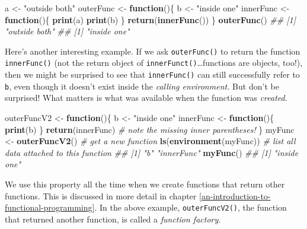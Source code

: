 \documentclass[12pt,krantz2]{krantz}
\makeatletter
\newenvironment{Shaded}{\begin{snugshade}}{\end{snugshade}}
\newcommand{\CommentTok}[1]{\textcolor[rgb]{0.37,0.37,0.37}{\textit{#1}}}
\newcommand{\ControlFlowTok}[1]{\textcolor[rgb]{0.27,0.27,0.27}{\textbf{#1}}}
\newcommand{\KeywordTok}[1]{\textcolor[rgb]{0.27,0.27,0.27}{\textbf{#1}}}
\newcommand{\NormalTok}[1]{#1}
\newcommand{\StringTok}[1]{\textcolor[rgb]{0.5,0.5,0.5}{#1}}
\newenvironment{kframe}{%
\medskip{}
\setlength{\fboxsep}{.8em}
 \def\at@end@of@kframe{}%
 \ifinner\ifhmode%
  \def\at@end@of@kframe{\end{minipage}}%
  \begin{minipage}{\columnwidth}%
 \fi\fi%
 \def\FrameCommand##1{\hskip\@totalleftmargin \hskip-\fboxsep
 \colorbox{shadecolor}{##1}\hskip-\fboxsep
     \hskip-\linewidth \hskip-\@totalleftmargin \hskip\columnwidth}%
 \MakeFramed {\advance\hsize-\width
   \@totalleftmargin\z@ \linewidth\hsize
   \@setminipage}}%
 {\par\unskip\endMakeFramed%
 \at@end@of@kframe}
\renewenvironment{Shaded}{\begin{kframe}}{\end{kframe}}
\makeatother
\begin{document}
\begin{Shaded}
\begin{Highlighting}[]
\NormalTok{a <-}\StringTok{ "outside both"}
\NormalTok{outerFunc <-}\StringTok{ }\ControlFlowTok{function}\NormalTok{()\{}
\NormalTok{  b <-}\StringTok{ "inside one"}
\NormalTok{  innerFunc <-}\StringTok{ }\ControlFlowTok{function}\NormalTok{()\{}
    \KeywordTok{print}\NormalTok{(a) }
    \KeywordTok{print}\NormalTok{(b)}
\NormalTok{  \}}
  \KeywordTok{return}\NormalTok{(}\KeywordTok{innerFunc}\NormalTok{())}
\NormalTok{\}}
\KeywordTok{outerFunc}\NormalTok{()}
\CommentTok{## [1] "outside both"}
\CommentTok{## [1] "inside one"}
\end{Highlighting}
\end{Shaded}

Here's another interesting example. If we ask \texttt{outerFunc()} to return the function \texttt{innerFunc()} (not the return object of \texttt{innerFunct()}\ldots{}functions are objects, too!), then we might be surprised to see that \texttt{innerFunc()} can still successfully refer to \texttt{b}, even though it doesn't exist inside the \emph{calling environment.} But don't be surprised! What matters is what was available when the function was \emph{created}.

\begin{Shaded}
\begin{Highlighting}[]
\NormalTok{outerFuncV2 <-}\StringTok{ }\ControlFlowTok{function}\NormalTok{()\{}
\NormalTok{  b <-}\StringTok{ "inside one"}
\NormalTok{  innerFunc <-}\StringTok{ }\ControlFlowTok{function}\NormalTok{()\{}
    \KeywordTok{print}\NormalTok{(b)}
\NormalTok{  \}}
  \KeywordTok{return}\NormalTok{(innerFunc) }\CommentTok{# note the missing inner parentheses!}
\NormalTok{\}}
\NormalTok{myFunc <-}\StringTok{ }\KeywordTok{outerFuncV2}\NormalTok{() }\CommentTok{# get a new function}
\KeywordTok{ls}\NormalTok{(}\KeywordTok{environment}\NormalTok{(myFunc)) }\CommentTok{# list all data attached to this function}
\CommentTok{## [1] "b"         "innerFunc"}
\KeywordTok{myFunc}\NormalTok{()}
\CommentTok{## [1] "inside one"}
\end{Highlighting}
\end{Shaded}

We use this property all the time when we create functions that return other functions. This is discussed in more detail in chapter \ref{an-introduction-to-functional-programming}. In the above example, \texttt{outerFuncV2()}, the function that returned another function, is called a \emph{function factory}.
\end{document}
